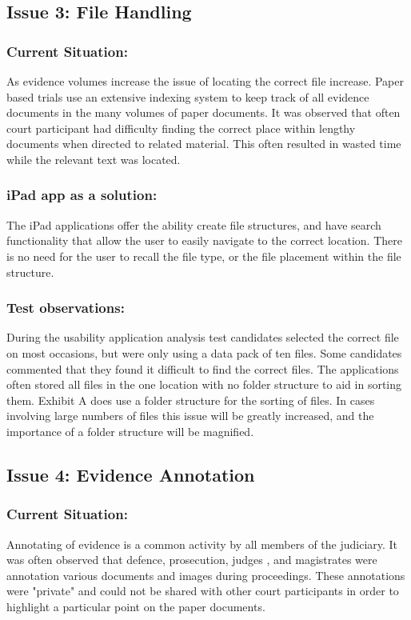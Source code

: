 \documentclass{article}
\begin{document}
\subsection{Issue 3: File Handling}
\subsubsection{Current Situation:}
As evidence volumes increase the issue of locating the correct file increase. Paper based trials use an extensive indexing system to keep track of all evidence documents in the many volumes of paper documents. It was observed that often court participant had difficulty finding the correct place within lengthy documents when directed to related material. This often resulted in wasted time while the relevant text was located.\\
\subsubsection{iPad app as a solution:}
The iPad applications offer the ability create file structures, and have search functionality that allow the user to easily navigate to the correct location. There is no need for the user to recall the file type, or the file placement within the file structure.
\\
\subsubsection{Test observations:}
During the usability application analysis test candidates selected the correct file on most occasions, but were only using a data pack of ten files. Some candidates commented that they found it difficult to find the correct files. The applications often stored all files in the one location with no folder structure to aid in sorting them. Exhibit A does use a folder structure for the sorting of files. In cases involving large numbers of files this issue will be greatly increased, and the importance of a folder structure will be magnified.\\


\subsection{Issue 4: Evidence Annotation}
\subsubsection{Current Situation:}
Annotating of evidence is a common activity by all members of the judiciary. It was often observed that defence, prosecution, judges , and magistrates were annotation various documents and images during proceedings. These annotations were "private" and could not be shared with other court participants in order to highlight a particular point on the paper documents.
\\
\end{document}

